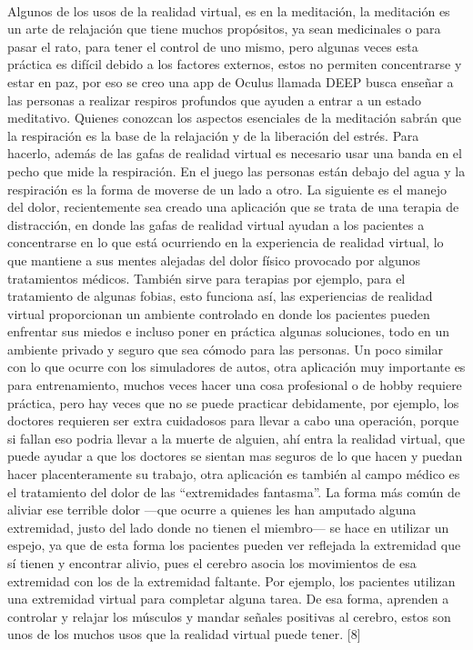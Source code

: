 \documentclass{bmcart}
\begin{document}
\paragraph{}
Algunos de los usos de la realidad virtual, es en la meditación, la meditación es un arte de relajación que tiene muchos propósitos, ya sean medicinales o para pasar el rato, para tener el control de uno mismo, pero algunas veces esta práctica es difícil debido a los factores externos, estos no permiten concentrarse y estar en paz, por eso se creo una app de Oculus llamada DEEP busca enseñar a las personas a realizar respiros profundos que ayuden a entrar a un estado meditativo. Quienes conozcan los aspectos esenciales de la meditación sabrán que la respiración es la base de la relajación y de la liberación del estrés. Para hacerlo, además de las gafas de realidad virtual es necesario usar una banda en el pecho que mide la respiración. En el juego las personas están debajo del agua y la respiración es la forma de moverse de un lado a otro. La siguiente es el manejo del dolor, recientemente sea creado una aplicación que se trata de una terapia de distracción, en donde las gafas de realidad virtual ayudan a los pacientes a concentrarse en lo que está ocurriendo en la experiencia de realidad virtual, lo que mantiene a sus mentes alejadas del dolor físico provocado por algunos tratamientos médicos. También sirve para terapias por ejemplo, para el tratamiento de algunas fobias, esto funciona así, las experiencias de realidad virtual proporcionan un ambiente controlado en donde los pacientes pueden enfrentar sus miedos e incluso poner en práctica algunas soluciones, todo en un ambiente privado y seguro que sea cómodo para las personas. Un poco similar con lo que ocurre con los simuladores de autos, otra aplicación muy importante es para entrenamiento, muchos veces hacer una cosa profesional o de hobby requiere práctica, pero hay veces que no se puede practicar debidamente, por ejemplo, los doctores requieren ser extra cuidadosos para llevar a cabo una operación, porque si fallan eso podria llevar a la muerte de alguien, ahí entra la realidad virtual, que puede ayudar a que los doctores se sientan mas seguros de lo que hacen y puedan hacer placenteramente su trabajo, otra aplicación es también al campo médico es el tratamiento del dolor de las “extremidades fantasma”. La forma más común de aliviar ese terrible dolor —que ocurre a quienes les han amputado alguna extremidad, justo del lado donde no tienen el miembro— se hace en utilizar un espejo, ya que de esta forma los pacientes pueden ver reflejada la extremidad que sí tienen y encontrar alivio, pues el cerebro asocia los movimientos de esa extremidad con los de la extremidad faltante. Por ejemplo, los pacientes utilizan una extremidad virtual para completar alguna tarea. De esa forma, aprenden a controlar y relajar los músculos y mandar señales positivas al cerebro, estos son unos de los muchos usos que la realidad virtual puede tener. [8]
\end{document}
